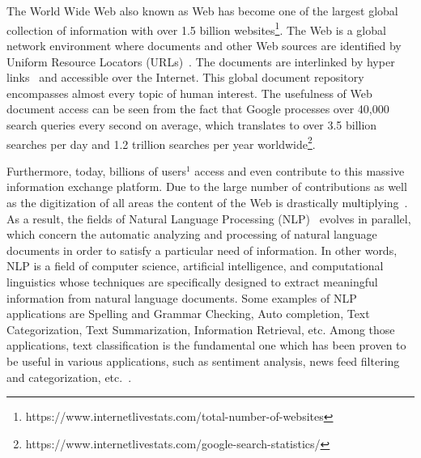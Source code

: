 \section*{}
The World Wide Web also known as Web has become one of the largest global collection of information %
with over 1.5 billion websites\footnote{https://www.internetlivestats.com/total-number-of-websites}. The Web is a global network environment where documents and other Web sources are identified by Uniform Resource Locators (URLs)~\cite{berners1998uri}. The documents are interlinked by hyper links~\cite{jacobs2004architecture} and accessible over the Internet. This global document repository encompasses almost every topic of human interest. The usefulness of Web document access can be seen from the fact that Google processes over 40,000 search queries every second on average, which translates to over 3.5 billion searches per day and 1.2 trillion searches per year worldwide\footnote{https://www.internetlivestats.com/google-search-statistics/}. 

Furthermore, today, billions  of  users$^1$ access and even contribute to this massive information exchange platform. Due to the large number of contributions as well as the digitization of all areas the content of the Web is drastically multiplying~\cite{STCImprovedby}. %
As a result, the fields of Natural  Language  Processing (NLP)~\cite{Jurafsky:2009:SLP:1214993} evolves in parallel, which concern the automatic analyzing and processing of natural language documents in order to satisfy a particular need of information. In other words, NLP is a field of computer science, artificial intelligence, and computational linguistics whose techniques are specifically designed to extract meaningful information from natural language documents. Some examples of NLP applications are Spelling and Grammar Checking, Auto  completion, Text Categorization, Text Summarization, Information Retrieval, etc.   Among those applications, text classification is the fundamental one which has been proven to be useful in various applications, such as sentiment analysis, news feed filtering and categorization, etc.~\cite{STTopicMemory}.

